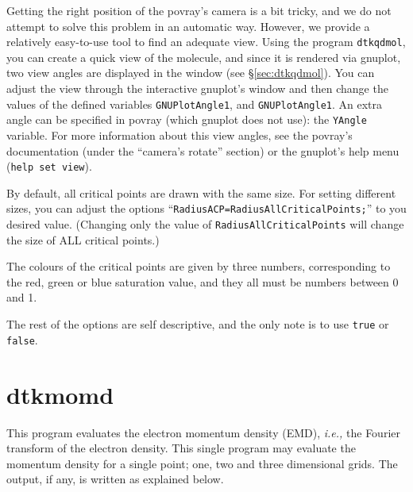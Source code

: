 Getting the right position of the povray's camera is a bit tricky, and we do not attempt to solve this problem in an automatic way. However, we provide a relatively easy-to-use tool to find an adequate view. Using the program \texttt{dtkqdmol}, you can create a quick view of the molecule, and since it is rendered via gnuplot, two view angles are displayed in the window (see \S\ref{sec:dtkqdmol}). You can adjust the view through the interactive gnuplot's window and then change the values of the defined variables \texttt{GNUPlotAngle1}, and \texttt{GNUPlotAngle1}. An extra angle can be specified in povray (which gnuplot does not use): the \texttt{YAngle} variable. For more information about this view angles, see the povray's documentation (under the ``camera's rotate'' section) or the gnuplot's help menu (\texttt{help set view}).

By default, all critical points are drawn with the same size. For setting different sizes, you can adjust the options ``\texttt{RadiusACP=RadiusAllCriticalPoints;}'' to you desired value. (Changing only the value of \texttt{RadiusAllCriticalPoints} will change the size of ALL critical points.)

The colours of the critical points are given by three numbers, corresponding to the red, green or blue saturation value, and they all must be numbers between 0 and 1.

The rest of the options are self descriptive, and the only note is to use \texttt{true} or \texttt{false}.

\section{dtkmomd}

This program evaluates the electron momentum density (EMD), \textit{i.e.,} the Fourier transform of the electron density. This single program may evaluate the momentum density for a single point; one, two and three dimensional grids. The output, if any, is written as explained below.

